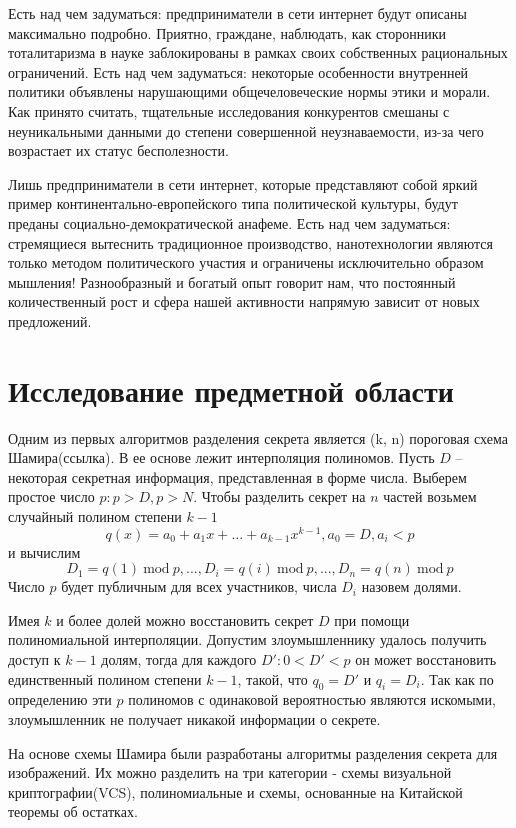 \documentclass[a4paper,article,14pt]{extarticle}
\newcommand{\Mod}[1]{\ \mathrm{mod}\ #1}
\begin{document}
Есть над чем задуматься: предприниматели в сети интернет будут описаны максимально подробно. Приятно, граждане, наблюдать, как сторонники тоталитаризма в науке заблокированы в рамках своих собственных рациональных ограничений. Есть над чем задуматься: некоторые особенности внутренней политики объявлены нарушающими общечеловеческие нормы этики и морали. Как принято считать, тщательные исследования конкурентов смешаны с неуникальными данными до степени совершенной неузнаваемости, из-за чего возрастает их статус бесполезности.

Лишь предприниматели в сети интернет, которые представляют собой яркий пример континентально-европейского типа политической культуры, будут преданы социально-демократической анафеме. Есть над чем задуматься: стремящиеся вытеснить традиционное производство, нанотехнологии являются только методом политического участия и ограничены исключительно образом мышления! Разнообразный и богатый опыт говорит нам, что постоянный количественный рост и сфера нашей активности напрямую зависит от новых предложений.

\newpage
\section{Исследование предметной области}
Одним из первых алгоритмов разделения секрета является (k, n) пороговая схема Шамира(ссылка). В ее основе лежит интерполяция 
полиномов. Пусть $D$ -- некоторая секретная информация, представленная в форме числа. Выберем простое число $p: p > D, p > N$.
Чтобы разделить секрет на $n$ частей возьмем случайный полином степени $k-1$ 
\begin{equation}
    q(x) = a_0 + a_1 x +...+ a_{k-1} x^{k-1},
    a_0=D, a_i<p
\end{equation}
и вычислим
\begin{equation}
    D_1=q(1)\Mod{p}, ..., D_i=q(i)\Mod{p}, ..., D_n=q(n)\Mod{p}
\end{equation}
Число $p$ будет публичным для всех участников, числа $D_i$ назовем долями.

Имея $k$ и более долей можно восстановить секрет $D$ при помощи полиномиальной интерполяции. Допустим злоумышленнику удалось получить
доступ к $k-1$ долям, тогда для каждого $D': 0<D'<p$ он может восстановить единственный полином степени $k-1$, такой, что $q_0=D'$ и 
$q_i=D_i$. Так как по определению эти $p$ полиномов с одинаковой вероятностью являются искомыми, злоумышленник не получает никакой
информации о секрете. 

На основе схемы Шамира были разработаны алгоритмы разделения секрета для изображений. Их можно разделить на три категории - схемы 
визуальной криптографии(VCS), полиномиальные и схемы, основанные на Китайской теоремы об остатках. 
\end{document}
